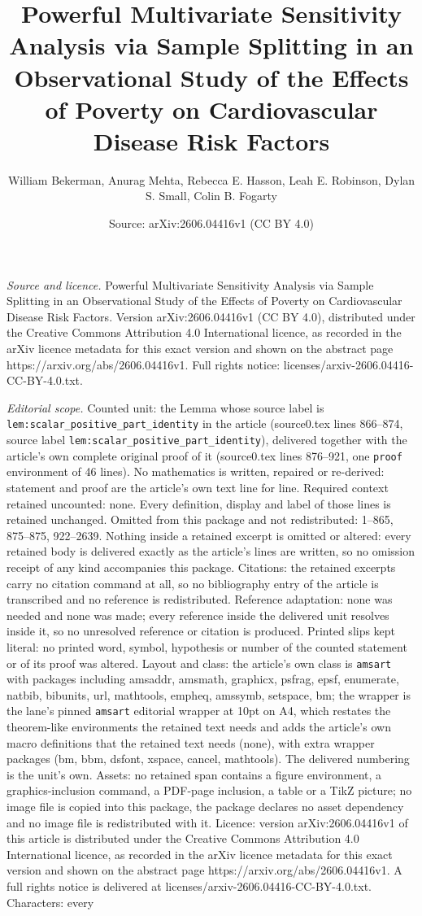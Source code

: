 \documentclass[10pt,a4paper]{amsart}
\title[Powerful Multivariate Sensitivity Analysis via Sample Splitt]{Powerful Multivariate Sensitivity Analysis via Sample Splitting in an Observational Study of the Effects of Poverty on Cardiovascular Disease Risk Factors}
\author{William Bekerman, Anurag Mehta, Rebecca E. Hasson, Leah E. Robinson, Dylan S. Small, Colin B. Fogarty}
\date{Source: arXiv:2606.04416v1 (CC BY 4.0)}
\begin{document}
\maketitle

\noindent\emph{Source and licence.} Powerful Multivariate Sensitivity Analysis via Sample Splitting in an Observational Study of the Effects of Poverty on Cardiovascular Disease Risk Factors. Version arXiv:2606.04416v1 (CC BY 4.0), distributed under the Creative Commons Attribution 4.0 International licence, as recorded in the arXiv licence metadata for this exact version and shown on the abstract page https://arxiv.org/abs/2606.04416v1. Full rights notice: licenses/arxiv-2606.04416-CC-BY-4.0.txt.\par\smallskip

\noindent\textit{Editorial scope.} Counted unit: the Lemma whose source label is \texttt{lem:scalar\_positive\_part\_identity} in the article (source0.tex lines 866--874, source label \texttt{lem:scalar\_positive\_part\_identity}), delivered together with the article's own complete original proof of it (source0.tex lines 876--921, one \texttt{proof} environment of 46 lines). No mathematics is written, repaired or re-derived: statement and proof are the article's own text line for line. Required context retained uncounted: none. Every definition, display and label of those lines is retained unchanged. Omitted from this package and not redistributed: 1--865, 875--875, 922--2639. Nothing inside a retained excerpt is omitted or altered: every retained body is delivered exactly as the article's lines are written, so no omission receipt of any kind accompanies this package. Citations: the retained excerpts carry no citation command at all, so no bibliography entry of the article is transcribed and no reference is redistributed. Reference adaptation: none was needed and none was made; every reference inside the delivered unit resolves inside it, so no unresolved reference or citation is produced. Printed slips kept literal: no printed word, symbol, hypothesis or number of the counted statement or of its proof was altered. Layout and class: the article's own class is \texttt{amsart} with packages including amsaddr, amsmath, graphicx, psfrag, epsf, enumerate, natbib, bibunits, url, mathtools, empheq, amssymb, setspace, bm; the wrapper is the lane's pinned \texttt{amsart} editorial wrapper at 10pt on A4, which restates the theorem-like environments the retained text needs and adds the article's own macro definitions that the retained text needs (none), with extra wrapper packages (bm, bbm, dsfont, xspace, cancel, mathtools). The delivered numbering is the unit's own. Assets: no retained span contains a figure environment, a graphics-inclusion command, a PDF-page inclusion, a table or a TikZ picture; no image file is copied into this package, the package declares no asset dependency and no image file is redistributed with it. Licence: version arXiv:2606.04416v1 of this article is distributed under the Creative Commons Attribution 4.0 International licence, as recorded in the arXiv licence metadata for this exact version and shown on the abstract page https://arxiv.org/abs/2606.04416v1. A full rights notice is delivered at licenses/arxiv-2606.04416-CC-BY-4.0.txt. Characters: every 
\end{document}

